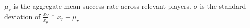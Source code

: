 \documentclass[preview]{standalone}
\begin{document}
\begin{center}
$\mu_r$ is the aggregate mean success rate across relevant players. $\sigma$ is the standard deviation of $\frac{x_V}{x_\mu}$ * $x_r - \mu_r$
\end{center}
\end{document}
